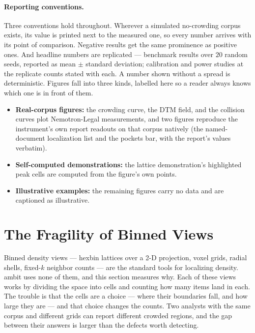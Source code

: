 \documentclass[11pt,letterpaper]{article}
\begin{document}
\paragraph{Reporting conventions.}
Three conventions hold throughout. Wherever a simulated no-crowding
corpus exists, its value is printed next to the measured one, so every
number arrives with its point of comparison. Negative results get the
same prominence as positive ones. And headline numbers are replicated
--- benchmark results over $20$ random seeds, reported as mean $\pm$
standard deviation; calibration and power studies at the replicate
counts stated with each. A number shown without a spread is
deterministic. Figures fall into three kinds, labelled here so a reader
always knows which one is in front of them.
\begin{itemize}
  \item \textbf{Real-corpus figures:} the crowding curve, the DTM field,
  and the collision curves plot Nemotron-Legal measurements, and two
  figures reproduce the instrument's own report readouts on that corpus
  natively (the named-document localization list and the pockets bar,
  with the report's values verbatim).
  \item \textbf{Self-computed demonstrations:} the lattice demonstration's
  highlighted peak cells are computed from the figure's own points.
    \item \textbf{Illustrative examples:} the remaining figures carry no
    data and are captioned as illustrative.
\end{itemize}

\section{The Fragility of Binned Views}
\label{sec:binned}

Binned density views --- hexbin lattices over a 2-D projection, voxel
grids, radial shells, fixed-$k$ neighbor counts --- are the standard
tools for localizing density. \textsf{ambit} uses none of them, and this
section measures why. Each of these views works by dividing
the space into cells and counting how many items land in each. The
trouble is that the cells are a choice --- where their boundaries fall,
and how large they are --- and that choice changes the counts. Two
analysts with the same corpus and different grids can report different
crowded regions, and the gap between their answers is larger than the
defects worth detecting.
\end{document}
